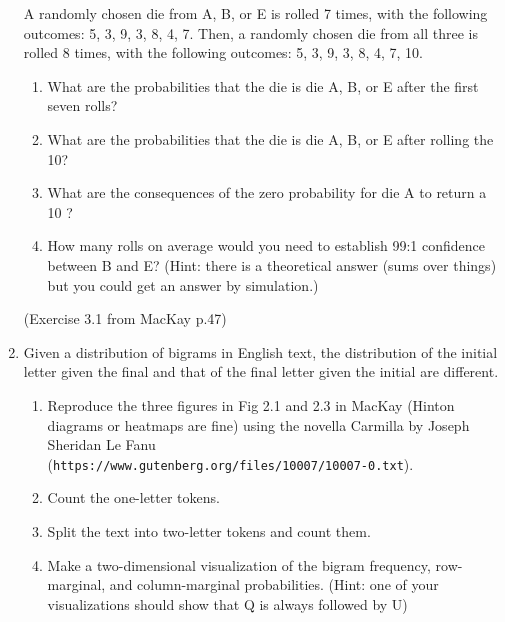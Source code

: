 \documentclass[12pt]{book}
\theoremstyle{definition}
\begin{document}
\begin{enumerate}
A randomly chosen die from A, B, or E is rolled 7 times, with the following outcomes: 5, 3, 9, 3, 8, 4, 7. Then, a randomly chosen die from all three is rolled 8 times, with the following outcomes: 5, 3, 9, 3, 8, 4, 7, 10. 

 \begin{enumerate}[label=\alph*)]
   \item  What are the probabilities that the die is die A, B, or E after the first seven rolls?
   \item  What are the probabilities that the die is die A, B, or E after rolling the 10?
   \item  What are the consequences of the zero probability for die A to return a 10 ? 
   \item  How many rolls on average would you need to establish 99:1 confidence between B and E?  (Hint: there is a theoretical answer (sums over things) but you could get an answer by simulation.)
 \end{enumerate}  

(Exercise 3.1 from MacKay p.47)

\item  Given a distribution of bigrams in English text, the distribution of the initial letter given the final and that of the final letter given the initial are different.  

 \begin{enumerate}[label=\alph*)] 
   \item  Reproduce the three figures in Fig 2.1 and 2.3 in MacKay  (Hinton diagrams or heatmaps are fine) using the novella Carmilla by Joseph Sheridan Le Fanu \\
(\texttt{https://www.gutenberg.org/files/10007/10007-0.txt}).   
   \item  Count the one-letter tokens.  
   \item  Split the text into two-letter tokens and count them.  
   \item  Make a two-dimensional visualization of the bigram frequency, row-marginal, and column-marginal probabilities.  (Hint: one of your visualizations should show that Q is always followed by U) 
 \end{enumerate}  

\end{enumerate}
\end{document}
